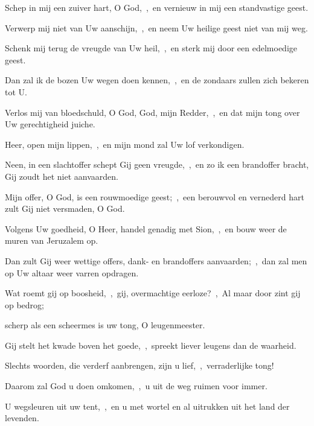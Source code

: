 \documentclass[12pt,twoside,a5paper]{article}
\begin{document}
\begin{halfparskip}
  Schep in mij een zuiver hart, O God,~\sep\ en vernieuw in mij een standvastige geest.

  Verwerp mij niet van Uw aanschijn,~\sep\ en neem Uw heilige geest niet van mij weg.

  Schenk mij terug de vreugde van Uw heil,~\sep\ en sterk mij door een edelmoedige geest.

  Dan zal ik de bozen Uw wegen doen kennen,~\sep\ en de zondaars zullen zich bekeren tot U.

  Verlos mij van bloedschuld, O God, God, mijn Redder,~\sep\ en dat mijn tong over Uw gerechtigheid juiche.

  Heer, open mijn lippen,~\sep\ en mijn mond zal Uw lof verkondigen.

  Neen, in een slachtoffer schept Gij geen vreugde,~\sep\ en zo ik een brandoffer bracht, Gij zoudt het niet aanvaarden.

  Mijn offer, O God, is een rouwmoedige geest;~\sep\ een berouwvol en vernederd hart zult Gij niet versmaden, O God.

  Volgens Uw goedheid, O Heer, handel genadig met Sion,~\sep\ en bouw weer de muren van Jeruzalem op.

  Dan zult Gij weer wettige offers, dank- en brandoffers aanvaarden;~\sep\ dan zal men op Uw altaar weer varren opdragen.
\end{halfparskip}



\begin{halfparskip}
  Wat roemt gij op boosheid,~\sep\ gij, overmachtige eerloze?~\sep\ Al maar door zint gij op bedrog;


  scherp als een scheermes is uw tong, O leugenmeester.

  Gij stelt het kwade boven het goede,~\sep\ spreekt liever leugens dan de waarheid.

  Slechts woorden, die verderf aanbrengen, zijn u lief,~\sep\ verraderlijke tong!

  Daarom zal God u doen omkomen,~\sep\ u uit de weg ruimen voor immer.

  U wegsleuren uit uw tent,~\sep\ en u met wortel en al uitrukken uit het land der levenden.
\end{halfparskip}
\end{document}
